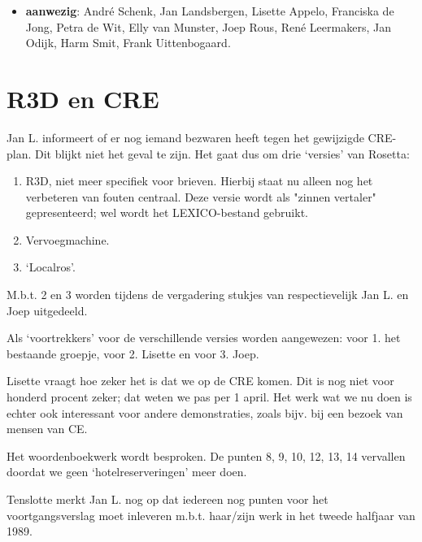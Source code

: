 
   \RosDate{\today}
   \RosSupersedes{-}
   \MakeRosTitle
\begin{itemize}
  \item {\bf aanwezig}: Andr\'{e} Schenk, Jan Landsbergen, Lisette Appelo,
                     Franciska de Jong, Petra de Wit, Elly van Munster, 
                     Joep Rous, Ren\'{e} Leermakers,
                     Jan Odijk, Harm Smit, Frank Uittenbogaard.
\end{itemize}

\section{R3D en CRE}

Jan L. informeert of er nog iemand bezwaren heeft tegen het gewijzigde 
CRE-plan. Dit blijkt niet het geval te zijn. Het gaat dus om drie `versies' 
van Rosetta:

\begin{enumerate}
  \item R3D, niet meer specifiek voor brieven. Hierbij staat nu alleen nog
        het verbeteren van fouten centraal. Deze versie wordt als "zinnen
        vertaler" gepresenteerd; wel wordt het LEXICO-bestand gebruikt.
  \item Vervoegmachine.
  \item `Localros'.
\end{enumerate}

M.b.t. 2 en 3 worden tijdens de vergadering stukjes van respectievelijk
Jan L. en Joep uitgedeeld.

Als `voortrekkers' voor de verschillende versies worden aangewezen:
voor 1. het bestaande groepje, voor 2. Lisette en voor 3. Joep.

Lisette vraagt hoe zeker het is dat we op de CRE komen. Dit is nog niet voor 
honderd procent zeker; dat weten we pas per 1 april. Het werk wat we nu doen is 
echter ook interessant voor andere demonstraties, zoals bijv. bij een bezoek 
van mensen van CE.

Het woordenboekwerk wordt besproken. De punten 8, 9, 10, 12, 13, 14 vervallen
doordat we geen `hotelreserveringen' meer doen.

Tenslotte merkt Jan L. nog op dat iedereen nog punten voor het 
voortgangsverslag moet 
inleveren m.b.t. haar/zijn werk in het tweede halfjaar van 1989. 

